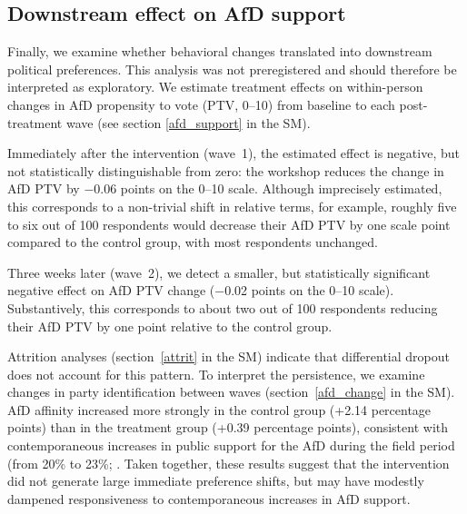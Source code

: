 \documentclass[12pt]{article}
\begin{document}
\subsection*{Downstream effect on AfD support}
Finally, we examine whether behavioral changes translated into downstream political preferences. This analysis was not preregistered and should therefore be interpreted as exploratory. We estimate treatment effects on within-person changes in AfD propensity to vote (PTV, 0--10) from baseline to each post-treatment wave (see section \ref{afd_support} in the SM).

Immediately after the intervention (wave~1), the estimated effect is negative, but not statistically distinguishable from zero: the workshop reduces the change in AfD PTV by −0.06 points on the 0--10 scale. Although imprecisely estimated, this corresponds to a non-trivial shift in relative terms, for example, roughly five to six out of 100 respondents would decrease their AfD PTV by one scale point compared to the control group, with most respondents unchanged. 

Three weeks later (wave~2), we detect a smaller, but statistically significant negative effect on AfD PTV change (−0.02 points on the 0--10 scale). Substantively, this corresponds to about two out of 100 respondents reducing their AfD PTV by one point relative to the control group.

Attrition analyses (section~\ref{attrit} in the SM) indicate that differential dropout does not account for this pattern. To interpret the persistence, we examine changes in party identification between waves (section~\ref{afd_change} in the SM). AfD affinity increased more strongly in the control group (+2.14 percentage points) than in the treatment group (+0.39 percentage points), consistent with contemporaneous increases in public support for the AfD during the field period (from 20\% to 23\%; \cite{PoliticoPolls}. Taken together, these results suggest that the intervention did not generate large immediate preference shifts, but may have modestly dampened responsiveness to contemporaneous increases in AfD support.



\end{document}
